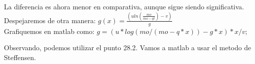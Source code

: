 \documentclass{article}
\theoremstyle{mytheoremstyle}
\theoremstyle{mytheoremstyle}
\theoremstyle{myproblemstyle}
\begin{document}
La diferencia es ahora menor en comparativa, aunque sigue siendo significativa. Despejaremos de otra manera:
$g(x)=\frac{(uln(\frac{mo}{mo-qt})-v)}{g}$
\\Grafiquemos en matlab como:  $g=(u*log(mo/(mo-q*x))-g*x)*x/v;$

Observando, podemos utilizar el punto 28.2. Vamos a matlab a usar el metodo de Steffensen.
\end{document}
